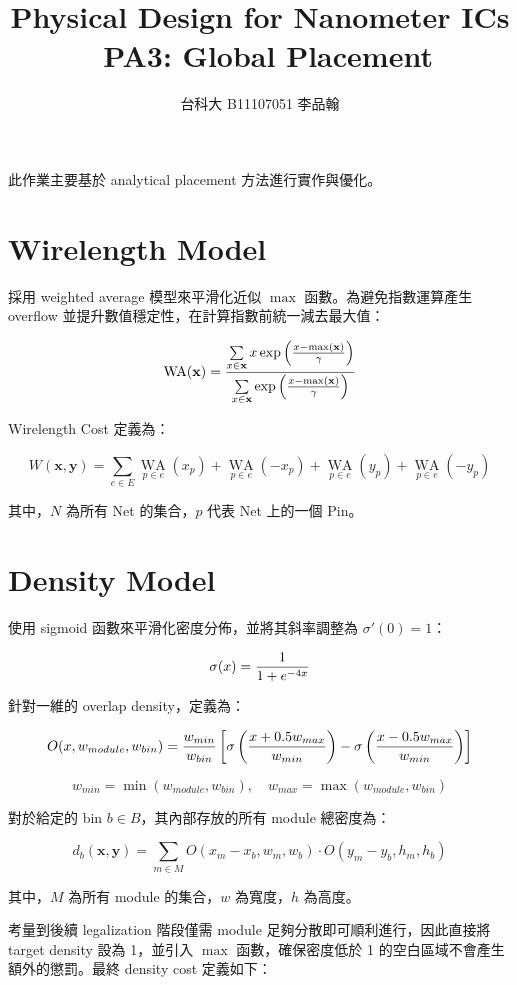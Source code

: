 \documentclass[12pt]{article}
\DeclareMathOperator{\WA}{WA}
\begin{document}
\title{Physical Design for Nanometer ICs \ PA3: Global Placement}
\author{台科大 B11107051 李品翰}
\date{}
\maketitle

此作業主要基於 analytical placement 方法進行實作與優化。

\section{Wirelength Model}

採用 weighted average 模型來平滑化近似 $\max$ 函數。為避免指數運算產生 overflow 並提升數值穩定性，在計算指數前統一減去最大值：

$$\WA(\mathbf x) = {\sum\limits_{x \in \mathbf x} x \exp\left({x - \max(\mathbf x) \over \gamma} \right) \over \sum\limits_{x \in \mathbf x} \exp\left({x - \max(\mathbf x) \over \gamma} \right)}$$

Wirelength Cost 定義為：

$$W(\mathbf x, \mathbf y) = \sum_{e \in E} \underset{p \in e}{\WA}(x_p) + \underset{p \in e}{\WA}(-x_p) + \underset{p \in e}{\WA}(y_p) + \underset{p \in e}{\WA}(-y_p)$$

其中，$N$ 為所有 Net 的集合，$p$ 代表 Net 上的一個 Pin。

\section{Density Model}

使用 sigmoid 函數來平滑化密度分佈，並將其斜率調整為 $\sigma'(0) = 1$：

$$\sigma(x) = {1 \over 1 + e^{-4x}}$$

針對一維的 overlap density，定義為：

$$O(x, w_{module}, w_{bin}) = {w_{min} \over w_{bin}} \left[\sigma\left({x + 0.5 w_{max} \over w_{min}}\right) - \sigma\left({x - 0.5 w_{max} \over w_{min}}\right)\right]$$

$$w_{min} = \min(w_{module}, w_{bin}), \quad w_{max} = \max(w_{module}, w_{bin})$$

對於給定的 bin $b \in B$，其內部存放的所有 module 總密度為：

$$d_b(\mathbf x, \mathbf y) = \sum_{m \in M} O(x_m - x_b, w_m, w_b) \cdot O(y_m - y_b, h_m, h_b)$$

其中，$M$ 為所有 module 的集合，$w$ 為寬度，$h$ 為高度。

考量到後續 legalization 階段僅需 module 足夠分散即可順利進行，因此直接將 target density 設為 1，並引入 $\max$ 函數，確保密度低於 1 的空白區域不會產生額外的懲罰。最終 density cost 定義如下：
\end{document}
